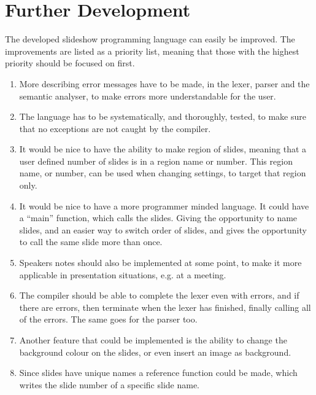 \chapter{Further Development}
\label{sec:furtherdev}
The developed slideshow programming language can easily be improved. The improvements are listed as a priority list, meaning that those with the highest priority should be focused on first.

\begin{enumerate}
	\item More describing error messages have to be made, in the lexer, parser and the semantic analyser, to make errors more understandable for the user.
	\item The language has to be systematically, and thoroughly, tested, to make sure that no exceptions are not caught by the compiler.
	\item It would be nice to have the ability to make region of slides, meaning that a user defined number of slides is in a region name or number. This region name, or number, can be used when changing settings, to target that region only.
	\item It would be nice to have a more programmer minded language. It could have a ``main'' function, which calls the slides. Giving the opportunity to name slides, and an easier way to switch order of slides, and gives the opportunity to call the same slide more than once.
	\item Speakers notes should also be implemented at some point, to make it more applicable in presentation situations, e.g. at a meeting.
	\item The compiler should be able to complete the lexer even with errors, and if there are errors, then terminate when the lexer has finished, finally calling all of the errors. The same goes for the parser too.
	\item Another feature that could be implemented is the ability to change the background colour on the slides, or even insert an image as background.
	\item Since slides have unique names a reference function could be made, which writes the slide number of a specific slide name.
\end{enumerate}